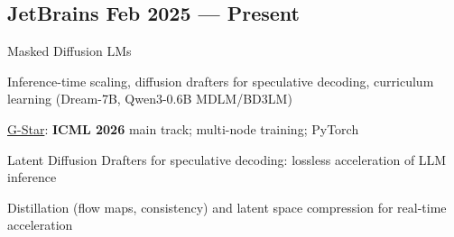 \subsection{JetBrains \hfill Feb 2025 --- Present}
\begin{zitemize}
\item[$\rightarrow$] Masked Diffusion LMs
\item Inference-time scaling, diffusion drafters for speculative decoding, curriculum learning (Dream-7B, Qwen3-0.6B MDLM/BD3LM)
\ifpublications\else %
\item \href{https://arxiv.org/abs/2510.08369}{G-Star}: \textbf{ICML 2026} main track; multi-node training; PyTorch
\fi
\item[$\rightarrow$] Latent Diffusion Drafters for speculative decoding: lossless acceleration of LLM inference
\item Distillation (flow maps, consistency) and latent space compression for real-time acceleration
\end{zitemize}
